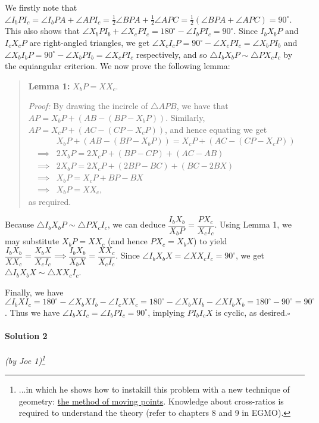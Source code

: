 \documentclass[10pt]{article}
\begin{document}
	We firstly note that $\angle I_b P I_c = \angle I_b PA + \angle AP I_c = \frac{1}{2} \angle BPA + \frac{1}{2} \angle APC = \frac{1}{2} (\angle BPA + \angle APC) = 90^{\circ}$. This also shows that $\angle X_b P I_b + \angle X_c P I_c = 180^\circ - \angle I_b P I_c = 90^{\circ}$. Since $I_bX_bP$ and $I_cX_cP$ are right-angled triangles, we get $\angle X_cI_cP = 90^{\circ} - \angle X_c P I_c = \angle X_bPI_b$ and $\angle X_bI_bP = 90^{\circ} - \angle X_bPI_b = \angle X_cPI_c$ respectively, and so $\triangle I_b X_b P \sim \triangle PX_c I_c$ by the equiangular criterion. We now prove the following lemma:
	\begin{quote}
	    \noindent \textbf{Lemma 1:} \(X_bP = XX_c\).

    	\noindent \textit{Proof:} By drawing the incircle of \(\triangle APB\), we have that \(AP = X_bP + (AB-(BP-X_bP))\). Similarly, \(AP = X_cP + (AC-(CP-X_cP))\), and hence equating we get \begin{align*}&X_bP + (AB-(BP-X_bP)) = X_cP + (AC-(CP-X_cP))\\ \implies &2X_bP=2X_cP+(BP-CP)+(AC-AB)\\
        \implies &2X_bP=2X_cP+(2BP-BC)+(BC-2BX)\\
        \implies &X_bP=X_cP+BP-BX\\
        \implies &X_bP = XX_c,\end{align*}as required.
	\end{quote}
	
	\noindent Because $\triangle I_b X_b P \sim \triangle PX_c I_c$, we can deduce $\dfrac{I_bX_b}{X_bP} = \dfrac{PX_c}{X_cI_c}$. Using Lemma 1, we may substitute $X_bP = XX_c$ (and hence $PX_c = X_bX$) to yield $\dfrac{I_bX_b}{XX_c} = \dfrac{X_bX}{X_cI_c} \implies \dfrac{I_bX_b}{X_bX} = \dfrac{XX_c}{X_cI_c}$. Since $\angle I_bX_bX = \angle XX_cI_c = 90^{\circ}$, we get $\triangle I_bX_bX \sim \triangle XX_cI_c$.
	
	Finally, we have $\angle I_bXI_c = 180^{\circ} - \angle X_bXI_b - \angle I_cXX_c = 180^{\circ} - \angle X_bXI_b - \angle XI_bX_b = 180^{\circ} - 90^{\circ} = 90^{\circ}$. Thus we have $\angle I_bXI_c = \angle I_bPI_c = 90^{\circ}$, implying $PI_bI_cX$ is cyclic, as desired.\hfill\ensuremath{\square}\\
	
		\noindent \makebox[\linewidth]{\rule{\textwidth}{0.4pt}}
	
	\paragraph{Solution 2} \textit{(by Joe 1)\footnote{...in which he shows how to instakill this problem with a new technique of geometry: \href{http://bit.ly/MO_moving_points}{the method of moving points}. Knowledge about cross-ratios is required to understand the theory (refer to chapters 8 and 9 in EGMO).}}\\
	
\end{document}

